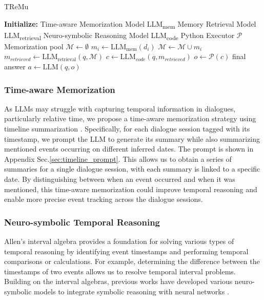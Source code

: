\begin{algorithm}
\small
\caption{TReMu} \label{algo1}
\begin{algorithmic}
\STATE \textbf{Initialize:} 
\STATE Time-aware Memorization Model LLM\textsubscript{mem}
\STATE Memory Retrieval Model LLM\textsubscript{retrieval}
\STATE Neuro-symbolic Reasoning Model LLM\textsubscript{code}
\STATE Python Executor $\mathcal{P}$
\STATE Memorization pool $\mathcal{M} \leftarrow \emptyset $
\STATE {}
    \STATE \( m_i \leftarrow \text{LLM}_\text{mem}(d_i) \)
    \STATE \( \mathcal{M} \leftarrow \mathcal{M} \cup m_i\)
\ENDFOR
\STATE {}
\STATE  \(m_{retrieved} \leftarrow \text{LLM}_\text{retrieval}(q, \mathcal{M})\)
\STATE \(c \leftarrow \text{LLM}_{code}(q, m_{retrieved})\)
\STATE \(o \leftarrow \mathcal{P}(c)\)
\STATE final answer \(a \leftarrow \text{LLM}(q, o)\)
\ENDFOR
\end{algorithmic}
\end{algorithm}
\vspace{-0.5cm}

\subsubsection{Time-aware Memorization} 
As LLMs may struggle with capturing temporal information in dialogues, particularly relative time, we propose a time-aware memorization strategy using timeline summarization \cite{steen-markert-2019-abstractive,rajaby-faghihi-etal-2022-crisiltlsum,sojitra2024timeline}. Specifically, for each dialogue session tagged with its timestamp, we prompt the LLM to generate its summary while also summarizing mentioned events occurring on different inferred dates. The prompt is shown in Appendix Sec.\ref{sec:timeline_prompt}. This allows us to obtain a series of summaries for a single dialogue session, with each summary is linked to a specific date. By distinguishing between when an event occurred and when it was mentioned, this time-aware memorization could improve temporal reasoning and enable more precise event tracking across the dialogue sessions.

\subsubsection{Neuro-symbolic Temporal Reasoning}
Allen's interval algebra \cite{allen1983maintaining} provides a foundation for solving various types of temporal reasoning by identifying event timestamps and performing temporal comparisons or calculations. For example, determining the difference between the timestamps of two events allows us to resolve temporal interval problems. Building on the interval algebras, previous works have developed various neuro-symbolic models to integrate symbolic reasoning with neural networks \cite{garcez2003reasoning,zhou2021temporal}.

